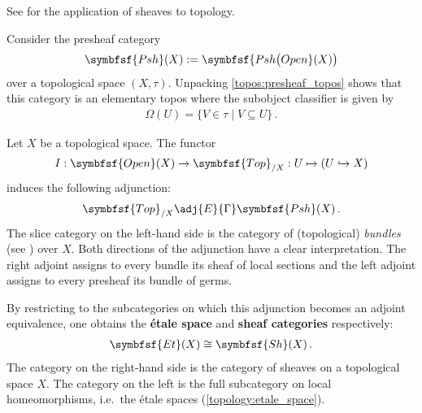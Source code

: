     See  for the application of sheaves to topology.

    \begin{property}\label{topos:sheaf_topos}
        Consider the presheaf category
        \begin{gather}
            \symbfsf{Psh}(X):=\symbfsf{Psh\bigl(Open}(X)\bigr)
        \end{gather}
        over a topological space $(X,\tau)$. Unpacking \cref{topos:presheaf_topos} shows that this category is an elementary topos where the subobject classifier is given by
        \begin{gather}
            \Omega(U) = \{V\in\tau\mid V\subseteq U\}\,.
        \end{gather}
    \end{property}

    \begin{construct}\label{topos:etale_adjunction}
        Let $X$ be a topological space. The functor
        \begin{gather}
            I:\symbfsf{Open}(X)\rightarrow\symbfsf{Top}_{/X}:U\mapsto(U\hookrightarrow X)
        \end{gather}
        induces the following adjunction:
        \begin{gather}
            \symbfsf{Top}_{/X}\adj{E}{\Gamma}\symbfsf{Psh}(X)\,.
        \end{gather}
        The slice category on the left-hand side is the category of (topological) \textit{bundles} (see ) over $X$. Both directions of the adjunction have a clear interpretation. The right adjoint assigns to every bundle its sheaf of local sections and the left adjoint assigns to every presheaf its bundle of germs.

        By restricting to the subcategories on which this adjunction becomes an adjoint equivalence, one obtains the \textbf{\'etale space} and \textbf{sheaf categories} respectively:
        \begin{gather}
            \symbfsf{Et}(X)\cong\symbfsf{Sh}(X)\,.
        \end{gather}
        The category on the right-hand side is the category of sheaves on a topological space $X$. The category on the left is the full subcategory on local homeomorphisms, i.e.~the \'etale spaces (\cref{topology:etale_space}).
    \end{construct}

